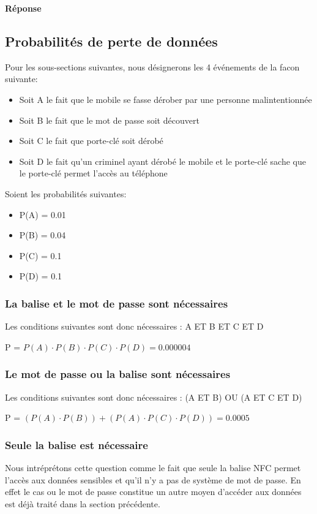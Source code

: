 \documentclass[francais,12pt]{article}
\begin{document}
	 {\color[rgb]{0,0.5,0.23}\textbf{Réponse}}
	 
	 \subsection*{Probabilités de perte de données}
	 Pour les sous-sections suivantes, nous désignerons les 4 événements de la facon suivante: 
	 
	 \begin{itemize}
	 	\item Soit A le fait que le mobile se fasse dérober par une personne malintentionnée
	 	\item Soit B le fait que le mot de passe soit découvert
	 	\item Soit C le fait que porte-clé soit dérobé
	 	\item Soit D le fait qu'un criminel ayant dérobé le mobile et le porte-clé sache que le porte-clé permet l'accès au téléphone
	 \end{itemize}
 
 	Soient les probabilités suivantes:
  	\begin{itemize}
  		\item P(A) = 0.01
  		\item P(B) = 0.04
  		\item P(C) = 0.1
  		\item P(D) = 0.1
  	\end{itemize}
	 
	 \subsubsection*{La balise et le mot de passe sont nécessaires}
	 
	 Les conditions suivantes sont donc nécessaires : A ET B ET C ET D
	 
	 P = $ P(A)  \cdot P(B) \cdot P(C) \cdot P(D) = 0.000004 $
	 
	 \subsubsection*{Le mot de passe ou la balise sont nécessaires}
	 Les conditions suivantes sont donc nécessaires : (A ET B) OU (A ET C ET D)
	 
	 P = $ (P(A) \cdot P(B)) + (P(A) \cdot P(C) \cdot P(D)) = 0.0005 $
	 
	 \subsubsection*{Seule la balise est nécessaire}
	 Nous intréprétons cette question comme le fait que seule la balise NFC permet l'accès aux données sensibles et qu'il n'y a pas de système de mot de passe. En effet le cas ou le mot de passe constitue un autre moyen d'accéder aux données est déjà traité dans la section précédente.
	 
\end{document}
